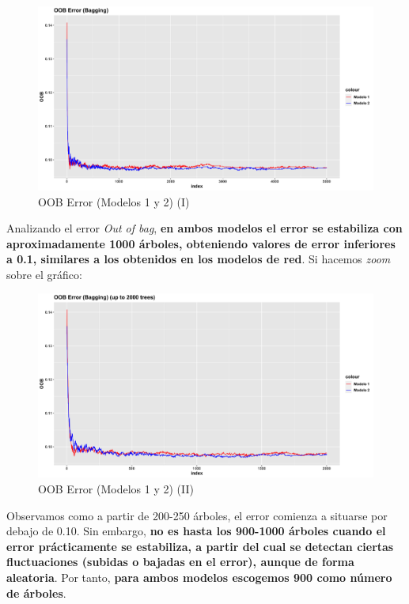 \documentclass[
]{article}
\begin{document}
\begin{figure}[h!]

{\centering \includegraphics[width=0.99\linewidth,height=0.99\textheight,]{./charts/OOB_1} 

}

\caption{OOB Error (Modelos 1 y 2) (I)}\label{fig:unnamed-chunk-65}
\end{figure}

Analizando el error \emph{Out of bag}, \textbf{en ambos modelos el error
se estabiliza con aproximadamente 1000 árboles, obteniendo valores de
error inferiores a 0.1, similares a los obtenidos en los modelos de
red}. Si hacemos \emph{zoom} sobre el gráfico:

\begin{figure}[h!]

{\centering \includegraphics[width=0.99\linewidth,height=0.99\textheight,]{./charts/OOB_2} 

}

\caption{OOB Error (Modelos 1 y 2) (II)}\label{fig:unnamed-chunk-66}
\end{figure}

Observamos como a partir de 200-250 árboles, el error comienza a
situarse por debajo de 0.10. Sin embargo, \textbf{no es hasta los
900-1000 árboles cuando el error prácticamente se estabiliza, a partir
del cual se detectan ciertas fluctuaciones (subidas o bajadas en el
error), aunque de forma aleatoria}. Por tanto, \textbf{para ambos
modelos escogemos 900 como número de árboles}.
\end{document}
